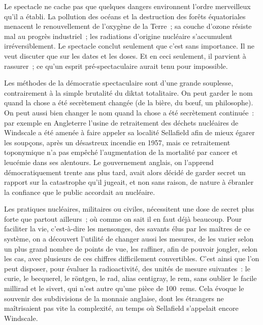 \documentclass[french,twoside]{book} %
\begin{document}
\noindent Le spectacle ne cache pas que quelques dangers environnent l’ordre merveilleux qu’il a établi. La pollution des océans et la destruction des forêts équatoriales menacent le renouvellement de l’oxygène de la Terre ; sa couche d’ozone résiste mal au progrès industriel ; les radiations d’origine nucléaire s’accumulent irréversiblement. Le spectacle conclut seulement que c’est sans importance. Il ne veut discuter que sur les dates et les doses. Et en ceci seulement, il parvient à rassurer ; ce qu’un esprit pré-spectaculaire aurait tenu pour impossible.\par
Les méthodes de la démocratie spectaculaire sont d’une grande souplesse, contrairement à la simple brutalité du diktat totalitaire. On peut garder le nom quand la chose a été secrètement changée (de la bière, du bœuf, un philosophe). On peut aussi bien changer le nom quand la chose a été secrètement continuée : par exemple en Angleterre l’usine de retraitement des déchets nucléaires de Windscale a été amenée à faire appeler sa localité Sellafield afin de mieux égarer les soupçons, après un désastreux incendie en 1957, mais ce retraitement toponymique n’a pas empêché l’augmentation de la mortalité par cancer et leucémie dans ses alentours. Le gouvernement anglais, on l’apprend démocratiquement trente ans plus tard, avait alors décidé de garder secret un rapport sur la catastrophe qu’il jugeait, et non sans raison, de nature à ébranler la confiance que le public accordait au nucléaire.\par
Les pratiques nucléaires, militaires ou civiles, nécessitent une dose de secret plus forte que partout ailleurs ; où comme on sait il en faut déjà beaucoup. Pour faciliter la vie, c’est-à-dire les mensonges, des savants élus par les maîtres de ce système, on a découvert l’utilité de changer aussi les mesures, de les varier selon un plus grand nombre de points de vue, les raffiner, afin de pouvoir jongler, selon les cas, avec plusieurs de ces chiffres difficilement convertibles. C’est ainsi que l’on peut disposer, pour évaluer la radioactivité, des unités de mesure suivantes : le curie, le becquerel, le röntgen, le rad, alias centigray, le rem, sans oublier le facile millirad et le sivert, qui n’est autre qu’une pièce de 100 rems. Cela évoque le souvenir des subdivisions de la monnaie anglaise, dont les étrangers ne maîtrisaient pas vite la complexité, au temps où Sellafield s’appelait encore Windscale.\par
\end{document}
